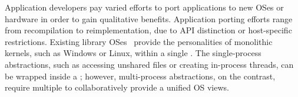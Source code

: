 Application developers pay varied efforts to port applications
to new OSes or hardware
in order to gain qualitative benefits.
Application porting efforts range from recompilation to reimplementation,
due to
API distinction
or host-specific restrictions.
Existing library OSes~\cite{porter11drawbridge, baumann13bascule, baumann14haven}
provide the personalities of monolithic kernels, such as Windows or Linux,
within a single \picoproc{}.
The single-process abstractions,
such as accessing unshared files or creating in-process threads,
can be wrapped inside a \libos{};
however, multi-process abstractions, on the contrast, require
multiple \picoprocs{} to collaboratively provide a unified OS views.



